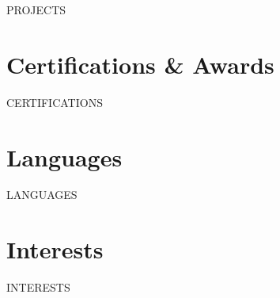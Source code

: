 \documentclass[a4paper,10pt]{article}
\begin{document}
{{PROJECTS}}



\section*{Certifications \& Awards}

{{CERTIFICATIONS}}



\section*{Languages}

{{LANGUAGES}}



\section*{Interests}

{{INTERESTS}}
\end{document}
